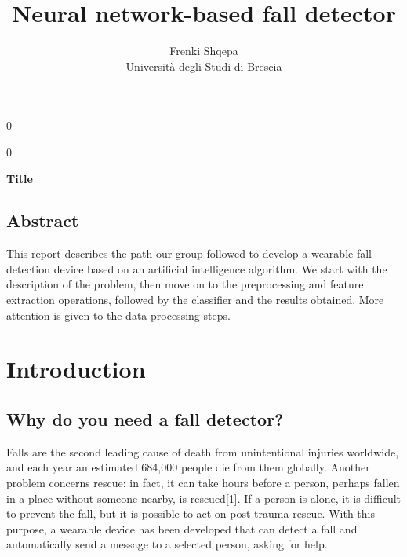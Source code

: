 \documentclass[12pt]{article}
\newcommand{\blind}{0}
\begin{document}
%

\def\spacingset#1{\renewcommand{\baselinestretch}%
{#1}\small\normalsize} \spacingset{1}



\blind
{
  \title{\bf Neural network-based fall detector}
  \author{Frenki Shqepa\hspace{.2cm}\\
    Università degli Studi di Brescia\\
    }
     \date{}
  \maketitle
  \thispagestyle{empty}
} \fi

\blind
{
  \bigskip
  \bigskip
  \bigskip
  \begin{center}
    {\LARGE\bf Title}
\end{center}
  \medskip
} \fi

\bigskip
\bigskip
\bigskip
\bigskip
\bigskip
\bigskip
\bigskip
\bigskip
\bigskip
\bigskip
\bigskip

\subsection*{\centering Abstract}
This report describes the path our group followed to develop a wearable fall detection device based on an artificial intelligence algorithm.
We start with the description of the problem, then move on to the preprocessing and feature extraction operations, followed by the classifier and the results obtained. More attention is given to the data processing steps.

\clearpage
{} 



\newpage
\spacingset{1.5} %

\section*{\centering Introduction}

\label{sec:intro}

\subsection*{Why do you need a fall detector?}
Falls are the second leading cause of death from unintentional injuries worldwide, and each year an estimated 684,000 people die from them globally.
Another problem concerns rescue: in fact, it can take hours before a person, perhaps fallen in a place without someone nearby, is rescued[1].
If a person is alone, it is difficult to prevent the fall, but it is possible to act on post-trauma rescue. With this purpose, a wearable device has been developed that can detect a fall and automatically send a message to a selected person, asking for help.
\end{document}
